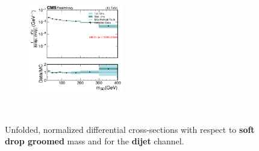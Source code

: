 \begin{figure}[htp!]
\begin{subfigure}
    \end{subfigure}
    \begin{subfigure}
      \centering
      \includegraphics[width=0.45\textwidth]{figures/multijet/unfolding/dijet/binnedResult_groomed_4.pdf}
    \end{subfigure}\\
    \caption{Unfolded, normalized differential cross-sections with respect to \textbf{soft drop groomed} mass and \pt for the \textbf{dijet} channel.}
    \label{fig:dijetresultsbinned_g}
  \end{figure}
  
